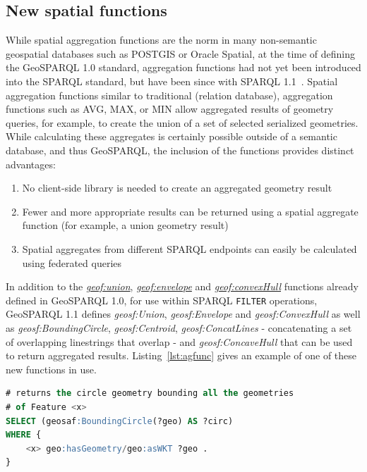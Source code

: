 \documentclass[runningheads]{llncs}
\begin{document}
\subsection{New spatial functions}\label{sec:newfunctions}
While spatial aggregation functions are the norm in many non-semantic geospatial databases such as POSTGIS or Oracle Spatial, 
at the time of defining the GeoSPARQL 1.0 standard, aggregation functions had not yet been introduced into the SPARQL standard,
but have been since with SPARQL 1.1~\cite{w3c_sparql_working_group_sparql_2013}. Spatial aggregation functions 
similar to traditional (relation database), aggregation functions such as AVG, MAX, or MIN allow aggregated results of geometry 
queries, for example, to create the union of a set of selected serialized geometries. While calculating these aggregates is 
certainly possible outside of a semantic database, and thus GeoSPARQL, the inclusion of the functions provides distinct advantages:

\begin{enumerate}
    \item No client-side library is needed to create an aggregated geometry result
    \item Fewer and more appropriate results can be returned using a spatial aggregate function (for example, a union geometry result)
    \item Spatial aggregates from different SPARQL endpoints can easily be calculated using federated queries 
\end{enumerate}

In addition to the \href{http://www.opengis.net/def/function/geosparql/union}{\emph{geof:union}}, \href{http://www.opengis.net/def/function/geosparql/envelope}{\emph{geof:envelope}} and \href{http://www.opengis.net/def/function/geosparql/convexHull}{\emph{geof:convexHull}} functions already defined in GeoSPARQL 1.0, 
for use within SPARQL \texttt{FILTER} operations, GeoSPARQL 1.1 defines \emph{geosf:Union}, \emph{geosf:Envelope} and \emph{geosf:ConvexHull}
as well as \emph{geosf:BoundingCircle}, \emph{geosf:Centroid}, \emph{geosf:ConcatLines} - concatenating a set of overlapping linestrings 
that overlap - and \emph{geosf:ConcaveHull} that can be used to return aggregated results. Listing~\ref{lst:agfunc} gives an example 
of one of these new functions in use.
\small
\begin{lstlisting}[caption=Aggregation Function example SPARQL query,label=lst:agfunc,language=sql,frame=single,basicstyle=\ttfamily,showstringspaces=false]
# returns the circle geometry bounding all the geometries 
# of Feature <x>
SELECT (geosaf:BoundingCircle(?geo) AS ?circ)
WHERE {
    <x> geo:hasGeometry/geo:asWKT ?geo .
}
\end{lstlisting}
\normalsize
\end{document}
